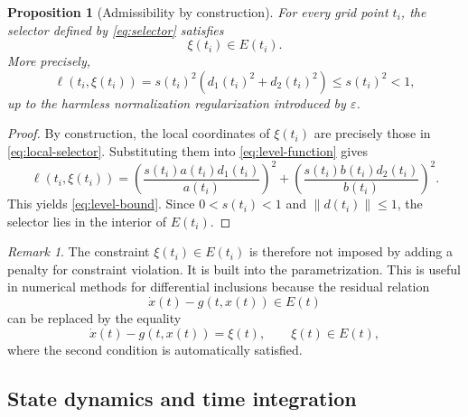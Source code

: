 \documentclass[11pt]{article}
\newtheorem{proposition}[theorem]{Proposition}
\theoremstyle{definition}
\theoremstyle{remark}
\newtheorem{remark}[theorem]{Remark}
\newcommand{\norm}[1]{\left\lVert #1\right\rVert}
\begin{document}
\begin{proposition}[Admissibility by construction]
\label{prop:admissibility}
For every grid point $t_i$, the selector defined by \eqref{eq:selector} satisfies
\begin{equation}
    \xi(t_i)\in E(t_i).
\end{equation}
More precisely,
\begin{equation}
    \ell(t_i,\xi(t_i))
    =s(t_i)^2\left(d_1(t_i)^2+d_2(t_i)^2\right)
    \leq s(t_i)^2<1,
    \label{eq:level-bound}
\end{equation}
up to the harmless normalization regularization introduced by $\varepsilon$.
\end{proposition}

\begin{proof}
By construction, the local coordinates of $\xi(t_i)$ are precisely those in \eqref{eq:local-selector}. Substituting them into \eqref{eq:level-function} gives
\begin{equation}
    \ell(t_i,\xi(t_i))
    =\left(\frac{s(t_i)a(t_i)d_1(t_i)}{a(t_i)}\right)^2
    +\left(\frac{s(t_i)b(t_i)d_2(t_i)}{b(t_i)}\right)^2.
\end{equation}
This yields \eqref{eq:level-bound}. Since $0<s(t_i)<1$ and $\norm{d(t_i)}\leq 1$, the selector lies in the interior of $E(t_i)$.
\end{proof}

\begin{remark}
The constraint $\xi(t_i)\in E(t_i)$ is therefore not imposed by adding a penalty for constraint violation. It is built into the parametrization. This is useful in numerical methods for differential inclusions because the residual relation
\begin{equation}
    \dot{x}(t)-g(t,x(t))\in E(t)
\end{equation}
can be replaced by the equality
\begin{equation}
    \dot{x}(t)-g(t,x(t))=\xi(t), \qquad \xi(t)\in E(t),
\end{equation}
where the second condition is automatically satisfied.
\end{remark}

\subsection{State dynamics and time integration}
\end{document}
